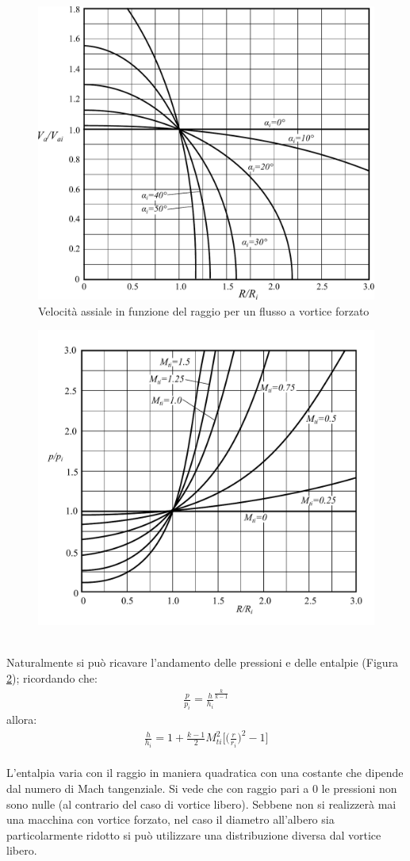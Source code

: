 \begin{figure}
\centering
  \includegraphics[width=.8\textwidth]{fig/VortForz.pdf}
\caption{Velocità assiale in funzione del raggio per un flusso a vortice forzato}
\label{fig:TurboFan}
\end{figure}
\begin{figure}
\centering
  \includegraphics[width=.8\textwidth]{fig/PVortForz.pdf}
\caption{}
\label{fig:PVortForz}
\end{figure}
\\Naturalmente si può ricavare l'andamento delle pressioni e delle entalpie (Figura \ref{fig:PVortForz}); ricordando che:
\begin{align*}
\frac{p}{p_i} = \frac{h}{h_i}^{\frac{k}{k-1}}
\end{align*}
allora:
\begin{align*}
\frac{h}{h_i} = 1 + \frac{k-1}{2} M_{ti}^2 \bigg[ \bigg(\frac{r}{r_i} \bigg)^2-1 \bigg]
\end{align*}
\\L'entalpia varia con il raggio in maniera quadratica con una costante che dipende dal numero di Mach tangenziale. Si vede che con raggio pari a $0$ le pressioni non sono nulle (al contrario del caso di vortice libero). Sebbene non si realizzerà mai una macchina con vortice forzato, nel caso il diametro all'albero sia particolarmente ridotto si può utilizzare una distribuzione diversa dal vortice libero. 
